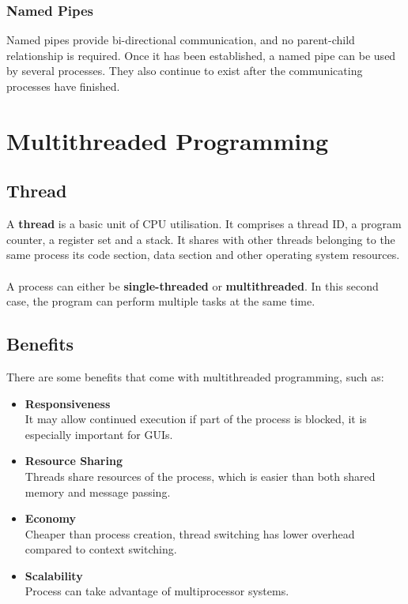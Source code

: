 \documentclass{article}
\begin{document}
\subsubsection{Named Pipes}
Named pipes provide bi-directional communication, and no parent-child relationship is required. Once it has been established, a named pipe can be used by several processes. They also continue to exist after the communicating processes have finished.

\section{Multithreaded Programming}
\subsection{Thread}
A \textbf{thread} is a basic unit of CPU utilisation. It comprises a thread ID, a program counter, a register set and a stack. It shares with other threads belonging to the same process its code section, data section and other operating system resources. \\ \\
A process can either be \textbf{single-threaded} or \textbf{multithreaded}. In this second case, the program can perform multiple tasks at the same time.

\subsection{Benefits}
There are some benefits that come with multithreaded programming, such as:

\begin{itemize}
	\item \textbf{Responsiveness}
	\vspace{.2cm} \\
	It may allow continued execution if part of the process is blocked, it is especially important for GUIs.
	
	\item \textbf{Resource Sharing}
	\vspace{.2cm} \\
	Threads share resources of the process, which is easier than both shared memory and message passing.
	
	\item \textbf{Economy}
	\vspace{.2cm} \\
	Cheaper than process creation, thread switching has lower overhead compared to context switching.
	
	\item \textbf{Scalability}
	\vspace{.2cm} \\
	Process can take advantage of multiprocessor systems.
\end{itemize}
\end{document}
